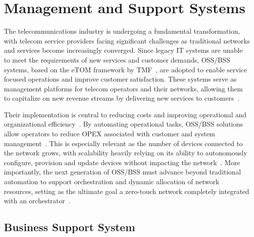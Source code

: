 \section{Management and Support Systems} \label{sota:bss-oss-mano}

The telecommunications industry is undergoing a fundamental transformation, with telecom service providers facing significant challenges as traditional networks and services become increasingly converged. Since legacy \acs{IT} systems are unable to meet the requirements of new services and customer demands, \acs{OSS}/\acs{BSS} systems, based on the eTOM framework by \acs{TMF}~\cite{eTOM-TMF}, are adopted to enable service focused operations and improve customer satisfaction. These systems serve as management platforms for telecom operators and their networks, allowing them to capitalize on new revenue streams by delivering new services to customers~\cite{NGOSSEvolutionTelecomSP}.

Their implementation is central to reducing costs and improving operational and organizational efficiency~\cite{NGOSSEvolutionTelecomSP}. By automating operational tasks, \acs{OSS}/\acs{BSS} solutions allow operators to reduce \acs{OPEX} associated with customer and system management~\cite{OSSMobileNetworks}. This is especially relevant as the number of devices connected to the network grows, with scalability heavily relying on its ability to autonomously configure, provision and update devices without impacting the network~\cite{EricsonOSS}. More importantly, the next generation of \acs{OSS}/\acs{BSS} must advance beyond traditional automation to support orchestration and dynamic allocation of network resources, setting as the ultimate goal a zero-touch network completely integrated with an orchestrator~\cite{SurveyOrchestrationOSSNextGenerationNetworks}.

\subsection{Business Support System}


